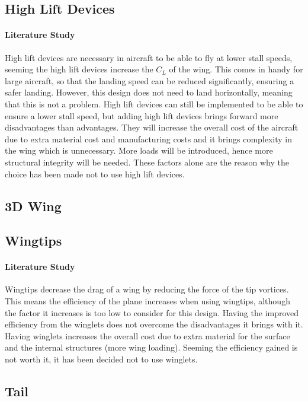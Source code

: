 \subsection*{High Lift Devices}

\paragraph{Literature Study} High lift devices are necessary in aircraft to be able to fly at lower stall speeds, seeming the high lift devices increase the $C_{L}$ of the wing. This comes in handy for large aircraft, so that the landing speed can be reduced significantly, ensuring a safer landing. However, this design does not need to land horizontally, meaning that this is not a problem. High lift devices can still be implemented to be able to ensure a lower stall speed, but adding high lift devices brings forward more disadvantages than advantages. They will increase the overall cost of the aircraft due to extra material cost and manufacturing costs and it brings complexity in the wing which is unnecessary. More loads will be introduced, hence more structural integrity will be needed. These factors alone are the reason why the choice has been made not to use high lift devices.

\subsection*{3D Wing}

\subsection*{Wingtips}

\paragraph{Literature Study} Wingtips decrease the drag of a wing by reducing the force of the tip vortices. This means the efficiency of the plane increases when using wingtips, although the factor it increases is too low to consider for this design. Having the improved efficiency from the winglets does not overcome the disadvantages it brings with it. Having winglets increases the overall cost due to extra material for the surface and the internal structures (more wing loading). Seeming the efficiency gained is not worth it, it has been decided not to use winglets.

\subsection{Tail}

